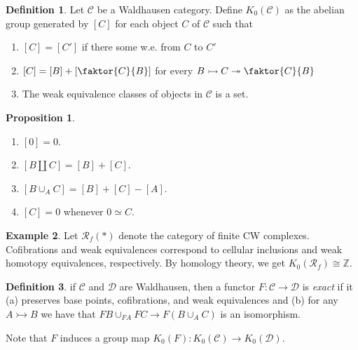 \documentclass[10pt,letterpaper,cm]{nupset}
\theoremstyle{definition}
\newtheorem{definition}{Definition}
\newtheorem{exmp}[definition]{Example}
\theoremstyle{theorem}
\newtheorem{prop}[theorem]{Proposition}
\theoremstyle{remark}
\newcommand{\Z}{\mathbb Z}
\newcommand{\1}{\mathbf{1}}
\renewcommand{\c}{\mathscr{C}}
\renewcommand{\d}{\mathscr{D}}
\newcommand{\0}{\vec 0}
\begin{document}
\begin{definition}
Let $\c$ be a Waldhausen category. Define $K_0(\c)$ as the abelian group generated by $[C]$ for each object $C$ of $\c$ such that
\begin{enumerate}
\item $[C] = [C']$ if there some w.e. from $C$ to $C'$
\item $[C] = [B] + \left[\faktor{C}{B}\right]$ for every $B \rightarrowtail  C \twoheadrightarrow \faktor{C}{B}$
\item The weak equivalence classes of objects in $\c$ is a set.
\end{enumerate}
\end{definition}

\begin{prop} $ $
\begin{enumerate}
\item $[0] = 0$.
\item $[B \coprod C] = [B] +[C]$.
\item $[B \cup_A C] = [B]+[C]-[A]$.
\item $[C]= 0$ whenever $0 \simeq C$.
\end{enumerate}
\end{prop}

\begin{exmp}
Let $\mathcal{R}_f(\ast)$ denote the category of finite CW complexes. Cofibrations and weak equivalences correspond to cellular inclusions  and weak homotopy equivalences, respectively. By homology theory, we get $K_0(\mathcal{R}_f) \cong \Z$.
\end{exmp}

\begin{definition}
if $\c$ and $\d$ are Waldhausen, then a functor $F: \c \to \d$ is \textit{exact} if it (a) preserves base points, cofibrations, and weak equivalences and (b) for any $A \rightarrowtail B$ we have that $FB \cup_{FA} FC \to F(B\cup_A C)$ is an isomorphism. 
\end{definition}

Note that $F$ induces a group map $K_0(F) :K_0(\c) \to K_0(\d)$.
\end{document}
